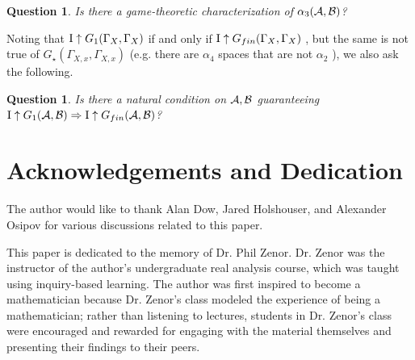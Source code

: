 \documentclass{amsart}
\theoremstyle{plain}
\newtheorem{question}[theorem]{Question}
\theoremstyle{definition}
\theoremstyle{remark}
\theoremstyle{plain}
\theoremstyle{definition}
\theoremstyle{remark}
\begin{document}
\begin{question}
Is there a game-theoretic characterization of \(\alpha_3(\mathcal{A},\mathcal{B})\)?
\end{question}

Noting that \(\mathrm{I}\uparrow G_1(\Gamma_X,\Gamma_X)\) if and only if
\(\mathrm{I}\uparrow G_{fin}(\Gamma_X,\Gamma_X)\) \cite{MR2417134}, but
the same is not true of \(G_\star(\Gamma_{X,x},\Gamma_{X,x})\)
(e.g. there are \(\alpha_4\) spaces that are not \(\alpha_2\)
\cite{shakhmatov2002convergence}),
we also ask the following.

\begin{question}
Is there a natural condition on \(\mathcal{A},\mathcal{B}\) guaranteeing
\(\mathrm{I}\uparrow G_1(\mathcal{A},\mathcal{B})\Rightarrow\mathrm{I}\uparrow G_{fin}(\mathcal{A},\mathcal{B})\)?
\end{question}

\section{Acknowledgements and Dedication}

The author would like to thank Alan Dow, Jared Holshouser,
and Alexander Osipov for various discussions related to this paper.

This paper is dedicated to the memory of Dr. Phil Zenor. Dr. Zenor
was the instructor of the author's undergraduate real analysis course,
which was taught using inquiry-based learning.
The author was first inspired to become a mathematician because
Dr. Zenor's class modeled the experience of being a mathematician;
rather than listening to lectures, students in Dr. Zenor's class
were encouraged and rewarded for engaging with the material
themselves and presenting their findings to their peers.



\end{document}
